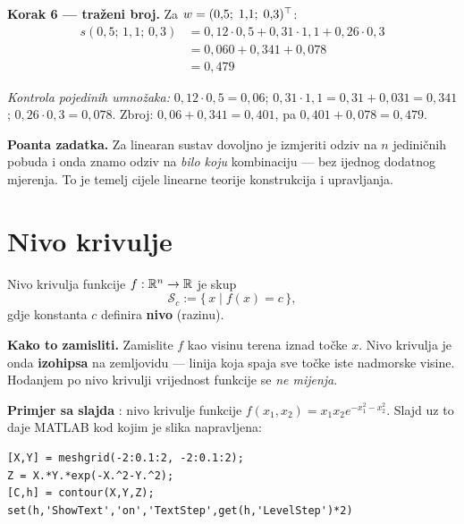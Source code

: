 \begin{zadatak}
\textbf{Korak 6 --- traženi broj.} Za $w = (0{,}5;\; 1{,}1;\; 0{,}3)^{\top}$:
\begin{align}
s(0{,}5;\, 1{,}1;\, 0{,}3)
&= 0{,}12 \cdot 0{,}5 + 0{,}31 \cdot 1{,}1 + 0{,}26 \cdot 0{,}3 \\
&= 0{,}060 + 0{,}341 + 0{,}078 \\
&= \boxed{0{,}479}
\end{align}

\emph{Kontrola pojedinih umnožaka:}
$0{,}12 \cdot 0{,}5 = 0{,}06$;
$0{,}31 \cdot 1{,}1 = 0{,}31 + 0{,}031 = 0{,}341$;
$0{,}26 \cdot 0{,}3 = 0{,}078$. Zbroj:
$0{,}06 + 0{,}341 = 0{,}401$, pa $0{,}401 + 0{,}078 = 0{,}479$. \checkmark

\textbf{Poanta zadatka.} Za linearan sustav dovoljno je izmjeriti odziv na
$n$ jediničnih pobuda i onda znamo odziv na \emph{bilo koju} kombinaciju ---
bez ijednog dodatnog mjerenja. To je temelj cijele linearne teorije
konstrukcija i upravljanja.
\end{zadatak}

\section{Nivo krivulje}
\label{sec:nivo}

\begin{definicija}
Nivo krivulja funkcije $f : \mathbb{R}^n \to \mathbb{R}$ je skup
\[
\mathcal{S}_c := \{\, x \mid f(x) = c \,\},
\]
gdje konstanta $c$ definira \textbf{nivo} (razinu).
\end{definicija}

\textbf{Kako to zamisliti.} Zamislite $f$ kao visinu terena iznad točke $x$.
Nivo krivulja je onda \textbf{izohipsa} na zemljovidu --- linija koja spaja sve
točke iste nadmorske visine. Hodanjem po nivo krivulji vrijednost funkcije se
\emph{ne mijenja}.

\textbf{Primjer sa slajda} : nivo krivulje funkcije
$f(x_1, x_2) = x_1x_2e^{-x_1^2-x_2^2}$. Slajd uz to daje MATLAB kod kojim je
slika napravljena:

\begin{verbatim}
[X,Y] = meshgrid(-2:0.1:2, -2:0.1:2);
Z = X.*Y.*exp(-X.^2-Y.^2);
[C,h] = contour(X,Y,Z);
set(h,'ShowText','on','TextStep',get(h,'LevelStep')*2)
\end{verbatim}

